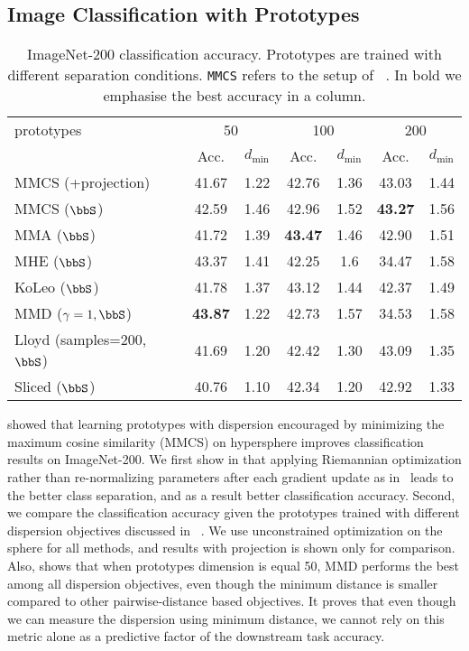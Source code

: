 \documentclass[10pt]{article} %
\newcommand\dmin{d_{\min}}
\begin{document}
\subsection{Image Classification with Prototypes}

\begin{table}[ht]
    \centering
    \begin{tabular}{l cccccc}
    \toprule
        prototypes & \multicolumn{2}{c}{50} & \multicolumn{2}{c}{100} & \multicolumn{2}{c}{200}  \\ 
        & Acc. & $\dmin$ & Acc. & $\dmin$ & Acc. & $\dmin$ \\
        \midrule
        MMCS (+projection) & 41.67 &1.22&42.76&1.36 &43.03&1.44 \\ \midrule
        MMCS  ($\bbS$) & 42.59 &1.46& 42.96&1.52& \textbf{43.27} &1.56\\   
        MMA ($\bbS$)& 41.72 & 1.39 & \textbf{43.47} &1.46& 42.90 & 1.51\\
        MHE ($\bbS$)&43.37& 1.41 &42.25&1.6 &34.47&1.58\\
        KoLeo ($\bbS$)&41.78   &1.37&43.12&1.44&42.37&1.49\\ \midrule
        MMD ($\gamma=1, \bbS$) & \textbf{43.87} &1.22&42.73&1.57&34.53& 1.58\\
        Lloyd (samples=200, $\bbS$) & 41.69 &1.20&42.42&1.30&43.09&1.35 \\
        Sliced  ($\bbS$) & 40.76 &1.10&42.34&1.20&42.92&1.33 \\
         \bottomrule
    \end{tabular}
    \caption{ImageNet-200 classification accuracy. Prototypes are trained with different separation conditions. \texttt{MMCS} refers to the setup of ~\citet{mettes2019hyperspherical}. In bold we emphasise the best accuracy in a column.}
    \label{tab:hpn-net}
\end{table}

\citet{mettes2019hyperspherical} showed that learning prototypes with dispersion encouraged by minimizing the maximum cosine similarity (MMCS) on hypersphere improves classification results on ImageNet-200. We first show in  that applying Riemannian optimization rather than re-normalizing parameters after each gradient update as in~\citet{mettes2019hyperspherical} leads to the better class separation, and as a result better classification accuracy. Second, we compare the classification accuracy given the prototypes trained with different dispersion objectives discussed in ~. We use unconstrained optimization on the sphere for all methods, and results with projection is shown only for comparison. Also,  shows that when prototypes dimension is equal 50, MMD performs the best among all dispersion objectives, even though the minimum distance is smaller compared to other pairwise-distance based objectives. It proves that even though we can measure the dispersion using minimum distance, we cannot rely on this metric alone as a predictive factor of the downstream task accuracy.
\end{document}
